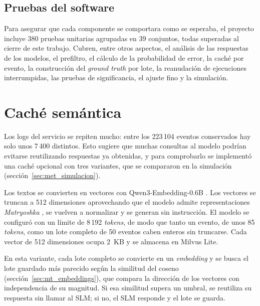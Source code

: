 \subsection{Pruebas del software}\label{sec:met_pruebas}

Para asegurar que cada componente se comportara como se esperaba, el proyecto incluye 380 pruebas unitarias agrupadas en 39 conjuntos, todas superadas al cierre de este trabajo. Cubren, entre otros aspectos, el análisis de las respuestas de los modelos, el prefiltro, el cálculo de la probabilidad de error, la caché por evento, la construcción del \textit{ground truth} por lote, la reanudación de ejecuciones interrumpidas, las pruebas de significancia, el ajuste fino y la simulación.

\section{Caché semántica}\label{sec:met_cache}

Los logs del servicio se repiten mucho: entre los 223\,104 eventos conservados hay solo unos 7\,400 distintos. Esto sugiere que muchas consultas al modelo podrían evitarse reutilizando respuestas ya obtenidas, y para comprobarlo se implementó una caché opcional con tres variantes, que se compararon en la simulación (sección~\ref{sec:met_simulacion}).


Los textos se convierten en vectores con Qwen3-Embedding-0.6B \cite{zhang2025_qwen3emb}. Los vectores se truncan a 512 dimensiones aprovechando que el modelo admite representaciones \textit{Matryoshka} \cite{kusupati2022_matryoshka}, se vuelven a normalizar y se generan sin instrucción. El modelo se configuró con un límite de 8\,192 \textit{tokens}, de modo que tanto un evento, de unos 85 \textit{tokens}, como un lote completo de 50 eventos caben enteros sin truncarse. Cada vector de 512 dimensiones ocupa 2~KB y se almacena en Milvus Lite.


En esta variante, cada lote completo se convierte en un \textit{embedding} y se busca el lote guardado más parecido según la similitud del coseno (sección~\ref{sec:mt_embeddings}), que compara la dirección de los vectores con independencia de su magnitud. Si esa similitud supera un umbral, se reutiliza su respuesta sin llamar al SLM; si no, el SLM responde y el lote se guarda.


